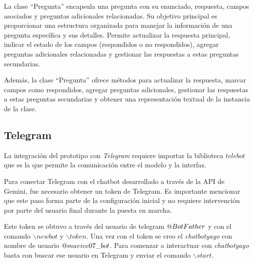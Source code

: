 La clase ``Pregunta'' encapsula una pregunta con su enunciado, respuesta, campos asociados y preguntas adicionales relacionadas. Su objetivo principal es proporcionar una estructura organizada para manejar la información de una pregunta específica y sus detalles. Permite actualizar la respuesta principal, indicar el estado de los campos (respondidos o no respondidos), agregar preguntas adicionales relacionadas y gestionar las respuestas a estas preguntas secundarias.

Además, la clase ``Pregunta'' ofrece métodos para actualizar la respuesta, marcar campos como respondidos, agregar preguntas adicionales, gestionar las respuestas a estas preguntas secundarias y obtener una representación textual de la instancia de la clase.

\subsection{Telegram}
\label{sec:Telegram}
La integración del prototipo con \textit{Telegram} requiere importar la biblioteca $telebot$ que es la que permite la comunicación entre el modelo y la interfaz. 

Para conectar Telegram con el chatbot desarrollado a través de la API de Gemini, fue necesario obtener un token de Telegram. Es importante mencionar que este paso forma parte de la configuración inicial y no requiere intervención por parte del usuario final durante la puesta en marcha.

Este token se obtuvo a través del usuario de telegram $\makeatletter @ BotFather$ y con el comando $\backslash newbot$ y $\backslash token$. Una vez con el token se creo el \textit{chatbotyayo} con nombre de usuario $\makeatletter @ mavice07\_bot$. Para comenzar a interactuar con \textit{chatbotyayo} basta con buscar ese usuario en Telegram y enviar el comando $\backslash start$. 

